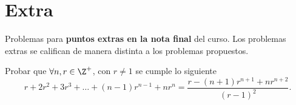 \section{Extra}

Problemas para \textbf{puntos extras en la nota final} del curso.
Los problemas extras se califican de manera distinta a los problemas propuestos.

\begin{problem}
    Probar que $\forall n, r \in \Z^+$, con $r \neq 1$ se cumple lo siguiente
    \[r + 2 r^2 + 3 r^3 + \dots + (n - 1) r^{n - 1} + n r^n = \frac{r - (n + 1)r^{n + 1} + nr^{n + 2}}{(r - 1)^2}.\]
\end{problem}